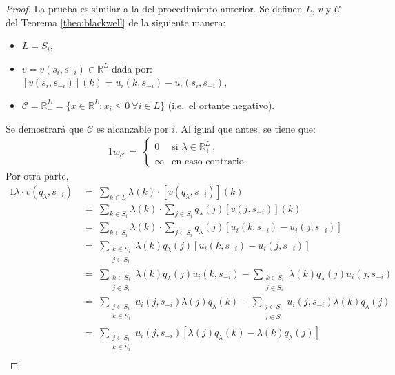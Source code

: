 \begin{proof}
La prueba es similar a la del procedimiento anterior. Se definen $L$, $v$ y $\mathcal{C}$ del Teorema \ref{theo:blackwell} de la siguiente manera:
\begin{itemize}[noitemsep]
  \item $L = S_i$,
  \item $v = v(s_i, s_{-i}) \in \mathbb{R}^L$ dada por:
    $[v(s_i, s_{-i})](k)=u_i(k, s_{-i}) - u_i(s_i, s_{-i})$,
  \item $\mathcal{C} = \mathbb{R}^L_- = \{x \in \mathbb{R}^L : x_i \leq 0\ \forall i \in L \}$ (i.e.\ el ortante negativo).
\end{itemize}
Se demostrará que $\mathcal{C}$ es alcanzable por $i$. Al igual que antes, se tiene que:
\begin{alignat}{1}
  w_{\mathcal{C}}\ =\ 
    \begin{cases}
	  0 & \text{si } \lambda \in \mathbb{R}^L_+ \,, \\
      \infty & \text{en caso contrario.}
    \end{cases}
\end{alignat}
Por otra parte,
\begin{alignat}{1}
	\lambda \cdot v(q_{\lambda}, s_{-i})\ 
	&=\ \sum_{k \in L} \lambda(k) \cdot [v(q_{\lambda}, s_{-i})](k) \\
	&=\ \sum_{k \in S_i} \lambda(k) \cdot \sum_{j \in S_i} q_{\lambda}(j)[v(j, s_{-i})] (k) \\
	&=\ \sum_{k \in S_i} \lambda(k) \cdot \sum_{j \in S_i} q_{\lambda}(j) [u_i(k, s_{-i}) - u_i(j, s_{-i})] \\
	&=\ \sum_{\substack{k \in S_i \\ j \in S_i}} \lambda(k) q_{\lambda}(j) [u_i(k, s_{-i}) - u_i(j, s_{-i})] \\
	&=\ \sum_{\substack{k \in S_i \\ j \in S_i}} \lambda(k) q_{\lambda}(j) u_i(k, s_{-i}) - \sum_{\substack{k \in S_i \\ j \in S_i}} \lambda(k) q_{\lambda}(j) u_i(j, s_{-i}) \\
	&=\ \sum_{\substack{j \in S_i \\ k \in S_i}} u_i(j, s_{-i}) \lambda(j) q_{\lambda}(k)  - \sum_{\substack{j \in S_i \\ j \in S_i}} u_i(j, s_{-i}) \lambda(k) q_{\lambda}(j) \\
	&=\ \sum_{\substack{j \in S_i \\ k \in S_i}} u_i(j, s_{-i}) [\lambda(j) q_{\lambda}(k)  - \lambda(k) q_{\lambda}(j)] \\

\end{alignat}
\end{proof}
